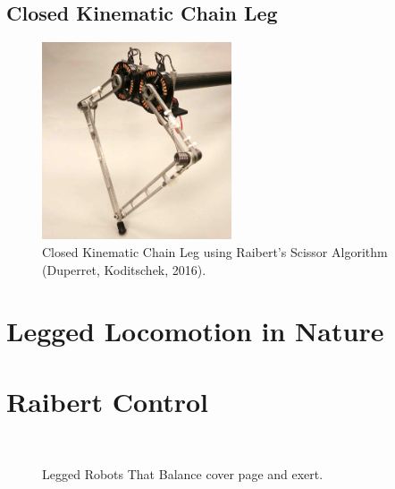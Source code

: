 \subsection{Closed Kinematic Chain Leg}

\begin{figure}
\centering
\includegraphics[width=0.5\textwidth]{images/literature/pen-state-scissor.jpg} 
\caption{Closed Kinematic Chain Leg using Raibert's Scissor Algorithm (Duperret, Koditschek, 2016).\cite{Duperret}}
\label{fig:pen-state-scissor}
\end{figure}

\section{Legged Locomotion in Nature}

\section{Raibert Control}

\begin{figure}
\centering
{}
~
\caption{Legged Robots That Balance cover page and exert.\cite{Raibert1989}}
\end{figure}


